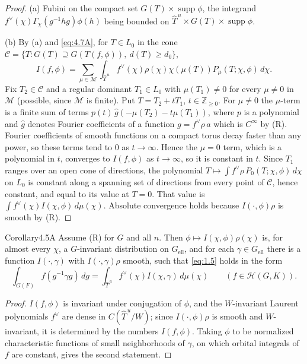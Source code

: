 \documentclass[12pt,letterpaper]{article}
\numberwithin{equation}{section}
\theoremstyle{plain}
\theoremstyle{remark}
\theoremstyle{plain}
\theoremstyle{definition}
\theoremstyle{remark}
\theoremstyle{remark}
\newcommand{\Hc}{\mathcal{H}}
\newcommand{\Thu}{\widehat{T}^{\,u}}
\DeclareMathOperator{\supp}{supp}
\newcommand{\ellr}{\mathrm{ell}}
\begin{document}
\begin{proof}
(a) Fubini on the compact set $G(T)\times\supp \phi$, the integrand $f^\vee(\chi)\Gamma_\chi(g^{-1}hg)\phi(h)$ being bounded on $\Thu\times G(T)\times\supp \phi$.

(b) By (a) and \eqref{eq:4.7A}, for $T\in L_0$ in the cone $\mathcal C=\{T: G(T)\supseteq G(T(f,\phi)),\ d(T)\ge d_0\}$,
\[
I(f,\phi)=\sum_{\mu\in\mathcal M}\int_{\Thu}f^\vee(\chi)\rho(\chi)\chi(\mu(T))P_\mu(T;\chi,\phi)\,d\chi.
\]
Fix $T_2\in\mathcal C$ and a regular dominant $T_1\in L_0$ with $\mu(T_1)\ne0$ for every $\mu\ne0$ in $\mathcal M$ (possible, since $\mathcal M$ is finite). Put $T=T_2+tT_1$, $t\in\mathbb{Z}_{\ge0}$. For $\mu\ne0$ the $\mu$-term is a finite sum of terms $p(t)\,\hat g(-\mu(T_2)-t\mu(T_1))$, where $p$ is a polynomial and $\hat g$ denotes Fourier coefficients of a function $g=f^\vee\rho\,a$ which is $C^\infty$ by (R). Fourier coefficients of smooth functions on a compact torus decay faster than any power, so these terms tend to $0$ as $t\to\infty$. Hence the $\mu=0$ term, which is a polynomial in $t$, converges to $I(f,\phi)$ as $t\to\infty$, so it is constant in $t$. Since $T_1$ ranges over an open cone of directions, the polynomial $T\mapsto\int f^\vee\rho\,P_0(T;\chi,\phi)\,d\chi$ on $L_0$ is constant along a spanning set of directions from every point of $\mathcal C$, hence constant, and equal to its value at $T=0$. That value is $\int f^\vee(\chi)I(\chi,\phi)\,d\mu(\chi)$. Absolute convergence holds because $I(\cdot,\phi)\rho$ is smooth by (R).
\end{proof}

\begin{fixedplain}{Corollary}{4.5A}\label{cor:4.5A}
Assume (R) for $G$ and all $n$. Then $\phi\mapsto I(\chi,\phi)\rho(\chi)$ is, for almost every $\chi$, a $G$-invariant distribution on $G_{\ellr}$, and for each $\gamma\in G_{\ellr}$ there is a function $I(\cdot,\gamma)$ with $I(\cdot,\gamma)\rho$ smooth, such that \eqref{eq:1.5} holds in the form
\[
\int_{G(F)}f(g^{-1}\gamma g)\,dg=\int_{\Thu}f^\vee(\chi)I(\chi,\gamma)\,d\mu(\chi)\qquad(f\in\Hc(G,K)).
\]
\end{fixedplain}

\begin{proof}
$I(f,\phi)$ is invariant under conjugation of $\phi$, and the $W$-invariant Laurent polynomials $f^\vee$ are dense in $C(\Thu/W)$; since $I(\cdot,\phi)\rho$ is smooth and $W$-invariant, it is determined by the numbers $I(f,\phi)$. Taking $\phi$ to be normalized characteristic functions of small neighborhoods of $\gamma$, on which orbital integrals of $f$ are constant, gives the second statement.
\end{proof}
\end{document}
